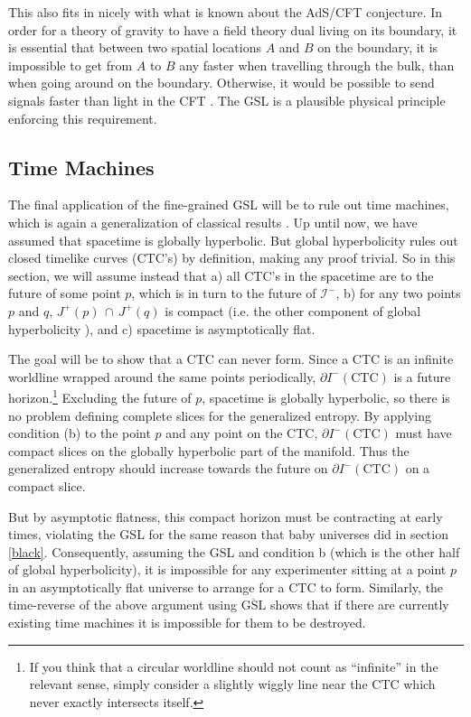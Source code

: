\documentclass[12pt]{article}
\begin{document}
This also fits in nicely with what is known about the AdS/CFT conjecture.  In order for a theory of gravity to have a field theory dual living on its boundary, it is essential that between two spatial locations $A$ and $B$ on the boundary, it is impossible to get from $A$ to $B$ any faster when travelling through the bulk, than when going around on the boundary.  Otherwise, it would be possible to send signals faster than light in the CFT \cite{PSW02}.  The GSL is a plausible physical principle enforcing this requirement.

\subsection{Time Machines}\label{time}

The final application of the fine-grained GSL will be to rule out time machines, which is again a generalization of classical results \cite{noctc}.  Up until now, we have assumed that spacetime is globally hyperbolic.  But global hyperbolicity rules out closed timelike curves (CTC's) by definition, making any proof trivial.  So in this section, we will assume instead that a) all CTC's in the spacetime are to the future of some point $p$, which is in turn to the future of $\mathcal{I}^-$, b) for any two points $p$ and $q$, $J^+(p)\,\cap\,J^+(q)$ is compact (i.e. the other component of global hyperbolicity \cite{BernalSanchez}), and c) spacetime is asymptotically flat.
  
The goal will be to show that a CTC can never form.  Since a CTC is an infinite worldline wrapped around the same points periodically, $\partial I^-(\mathrm{CTC})$ is a future horizon.\footnote{If you think that a circular worldline should not count as ``infinite'' in the relevant sense, simply consider a slightly wiggly line near the CTC which never exactly intersects itself.}  Excluding the future of $p$, spacetime is globally hyperbolic, so there is no problem defining complete slices for the generalized entropy.  By applying condition (b) to the point $p$ and any point on the CTC, $\partial I^-(\mathrm{CTC})$ must have compact slices on the globally hyperbolic part of the manifold.  Thus the generalized entropy should increase towards the future on $\partial I^-(\mathrm{CTC})$ on a compact slice.

But by asymptotic flatness, this compact horizon must be contracting at early times, violating the GSL for the same reason that baby universes did in section \ref{black}.  Consequently, assuming the GSL and condition b (which is the other half of global hyperbolicity), it is impossible for any experimenter sitting at a point $p$ in an asymptotically flat universe to arrange for a CTC to form.  Similarly, the time-reverse of the above argument using  $\overline{\mathrm{GSL}}$ shows that if there are currently existing time machines it is impossible for them to be destroyed.
\end{document}
